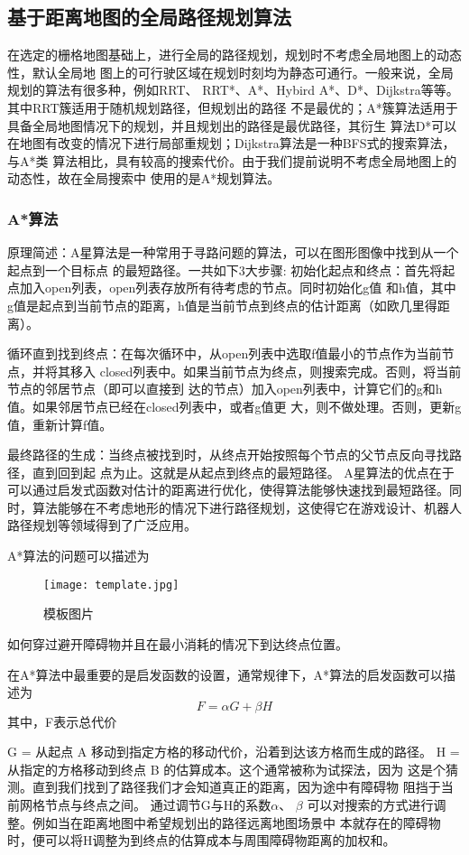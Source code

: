 \subsection{基于距离地图的全局路径规划算法}
在选定的栅格地图基础上，进行全局的路径规划，规划时不考虑全局地图上的动态性，默认全局地
图上的可行驶区域在规划时刻均为静态可通行。一般来说，全局规划的算法有很多种，例如RRT、
RRT*、A*、Hybird A*、D*、Dijkstra等等。其中RRT簇适用于随机规划路径，但规划出的路径
不是最优的；A*簇算法适用于具备全局地图情况下的规划，并且规划出的路径是最优路径，其衍生
算法D*可以在地图有改变的情况下进行局部重规划；Dijkstra算法是一种BFS式的搜索算法，与A*类
算法相比，具有较高的搜索代价。由于我们提前说明不考虑全局地图上的动态性，故在全局搜索中
使用的是A*规划算法。

\subsubsection{A*算法}
原理简述：A星算法是一种常用于寻路问题的算法，可以在图形图像中找到从一个起点到一个目标点
的最短路径。一共如下3大步骤:
初始化起点和终点：首先将起点加入open列表，open列表存放所有待考虑的节点。同时初始化g值
和h值，其中g值是起点到当前节点的距离，h值是当前节点到终点的估计距离（如欧几里得距离）。

循环直到找到终点：在每次循环中，从open列表中选取f值最小的节点作为当前节点，并将其移入
closed列表中。如果当前节点为终点，则搜索完成。否则，将当前节点的邻居节点（即可以直接到
达的节点）加入open列表中，计算它们的g和h值。如果邻居节点已经在closed列表中，或者g值更
大，则不做处理。否则，更新g值，重新计算f值。

最终路径的生成：当终点被找到时，从终点开始按照每个节点的父节点反向寻找路径，直到回到起
点为止。这就是从起点到终点的最短路径。
A星算法的优点在于可以通过启发式函数对估计的距离进行优化，使得算法能够快速找到最短路径。同时，算法能够在不考虑地形的情况下进行路径规划，这使得它在游戏设计、机器人路径规划等领域得到了广泛应用。

A*算法的问题可以描述为
\begin{figure}[ht]
    \centering
    \texttt{[image: template.jpg]}
    \caption{模板图片}
\end{figure}

如何穿过避开障碍物并且在最小消耗的情况下到达终点位置。

在A*算法中最重要的是启发函数的设置，通常规律下，A*算法的启发函数可以描述为
\begin{equation}
    F = \alpha G +\beta  H
\end{equation}
其中，F表示总代价

G = 从起点 A 移动到指定方格的移动代价，沿着到达该方格而生成的路径。
H = 从指定的方格移动到终点 B 的估算成本。这个通常被称为试探法，因为
这是个猜测。直到我们找到了路径我们才会知道真正的距离，因为途中有障碍物
阻挡于当前网格节点与终点之间。
通过调节G与H的系数$\alpha$、 $\beta$ 可以对搜索的方式进行调整。例如当在距离地图中希望规划出的路径远离地图场景中
本就存在的障碍物时，便可以将H调整为到终点的估算成本与周围障碍物距离的加权和。

